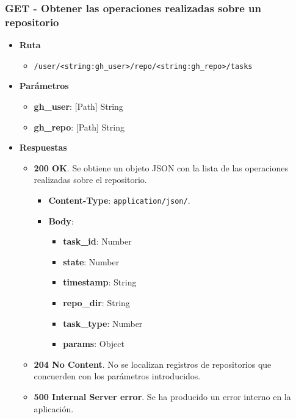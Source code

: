 \subsubsection{GET - Obtener las operaciones realizadas sobre un repositorio}

\begin{itemize}
    \item[] \textbf{Ruta}
        \begin{itemize} \setlength\itemsep{0.2em}
            \item[] \texttt{/user/<string:gh\_user>/repo/<string:gh\_repo>/tasks}
        \end{itemize}
    \item[] \textbf{Parámetros}
        \begin{itemize} \setlength\itemsep{0.2em}
            \item[] \textbf{gh\_user}: [Path] String
            \item[] \textbf{gh\_repo}: [Path] String
        \end{itemize}
    \item[] \textbf{Respuestas}
        \begin{itemize} \setlength\itemsep{0.2em}
            \item[] \textbf{200 OK}. Se obtiene un objeto JSON con la lista de las operaciones realizadas sobre el repositorio.
                \begin{itemize} \setlength\itemsep{0.2em}
                    \item[] \textbf{Content-Type}: \texttt{application/json/}.
                    \item[] \textbf{Body}: 
                        \begin{itemize} \setlength\itemsep{0.2em}
                            \item[] \textbf{task\_id}: Number
                            \item[] \textbf{state}: Number
                            \item[] \textbf{timestamp}: String
                            \item[] \textbf{repo\_dir}: String
                            \item[] \textbf{task\_type}: Number
                            \item[] \textbf{params}: Object
                        \end{itemize}
                \end{itemize}
            \item[] \textbf{204 No Content}. No se localizan registros de repositorios que concuerden con los parámetros introducidos.
            \item[] \textbf{500 Internal Server error}. Se ha producido un error interno en la aplicación.
        \end{itemize}
\end{itemize}

